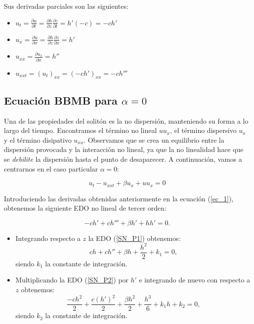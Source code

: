 Sus derivadas parciales son las siguientes:

\begin{itemize}
    \item $u_{t}=\frac{\partial u}{\partial t}=\frac{\partial h}{\partial z}\frac{\partial z}{\partial t}=h'(-c)=-ch'$
    \item $u_{x}=\frac{\partial u}{\partial x}=\frac{\partial h}{\partial z}\frac{\partial z}{\partial x}=h'$
    \item $u_{xx}=\frac{\partial u_{x}}{\partial x}=h''$
    \item $u_{xxt}=(u_{t})_{xx}=(-ch')_{xx}=-ch'''$
\end{itemize}

\subsection{Ecuación BBMB para $\alpha =0$}

Una de las propiedades del solitón es la no dispersión, manteniendo su forma a lo largo del tiempo. Encontramos el término no lineal $uu_{x}$, el término dispersivo $u_{x}$ y el término disipativo $u_{xx}$. Observamos que se crea un equilibrio entre la dispersión provocada y la interacción no lineal, ya que la no linealidad hace que se \textit{debilite} la dispersión hasta el punto de desaparecer. A continuación, vamos a centrarnos en el caso particular $\alpha=0$:

\begin{equation}
    u_{t}-u_{xxt}+\beta u_{x}+uu_{x}=0
\end{equation}

Introduciendo las derivadas obtenidas anteriormente en la ecuación (\ref{ec_1}), obtenemos la siguiente EDO no lineal de tercer orden:

\begin{equation}
    -ch'+ch'''+\beta h'+hh'=0. \label{SN_P1}
\end{equation}

\begin{itemize}
    \item Integrando respecto a $z$ la EDO (\ref{SN_P1}) obtenemos:
    \begin{equation}
        ch+ch''+\beta h+\frac{h^{2}}{2}+k_{1}=0 \label{SN_P2} \mbox{,}
    \end{equation}  siendo $k_{1}$ la constante de integración.
\end{itemize}
\begin{itemize}
    \item Multiplicando la EDO (\ref{SN_P2}) por $h'$ e integrando de nuevo con respecto a $z$ obtenemos:
    $$\frac{-ch^{2}}{2}+\frac{c(h')^{2}}{2}+\frac{\beta h^{2}}{2}+\frac{h^{3}}{6}+k_{1}h+k_{2}=0 \mbox{,}$$ siendo $k_{2}$ la constante de integración.
\end{itemize}


